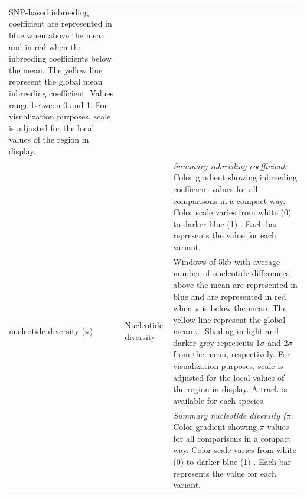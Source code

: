 \documentclass[9pt,twocolumn,twoside]{celabRxiv}
\begin{document}
\begin{longtable}{p{3cm}p{6cm}p{8cm}}
SNP-based inbreeding coefficient are represented in blue when above the mean and in red when the inbreeding coefficients below the mean. The yellow line represent the global mean inbreeding coefficient. Values range between 0 and 1. For visualization purposes, scale is adjusted for the local values of the region in display.\\
& & 	\textit{Summary inbreeding coefficient}: Color gradient showing inbreeding coefficient values for all comparisons in a compact way. Color scale varies from white (0) to darker blue (1) . Each bar represents the value for each variant.\\
nucleotide diversity ($\pi$) & Nucleotide diversity \citet{nei1979mathematical} & Windows of 5kb with average number of nucleotide differences above the mean are represented in blue and are represented in red when $\pi$ is below the mean. The yellow line represent the global mean $\pi$. Shading in light and darker grey represents 1$\sigma$ and 2$\sigma$ from the mean, respectively. For visualization purposes, scale is adjusted for the local values of the region in display. A track is available for each species.\\
& & 	\textit{Summary nucleotide diversity ($\pi$}: Color gradient showing $\pi$ values for all comparisons in a compact way. Color scale varies from white (0) to darker blue (1) . Each bar represents the value for each variant.\\


\end{longtable}
\end{document}
